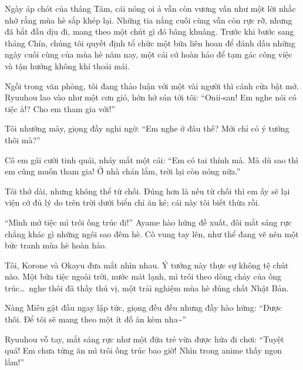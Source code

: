 \documentclass[../main.tex]{subfiles}
\begin{document}


Ngày áp chót của tháng Tám, cái nóng oi ả vẫn còn vương vấn như một lời nhắc nhở rằng mùa hè sắp khép lại. Những tia nắng cuối cùng vẫn còn rực rỡ, nhưng đã bắt đầu dịu đi, mang theo một chút gì đó bâng khuâng. Trước khi bước sang tháng Chín, chúng tôi quyết định tổ chức một bữa liên hoan để đánh dấu những ngày cuối cùng của mùa hè năm nay, một cái cớ hoàn hảo để tạm gác công việc và tận hưởng không khí thoải mái.

Ngồi trong văn phòng, tôi đang thảo luận với một vài người thì cánh cửa bật mở. Ryuuhou lao vào như một cơn gió, hớn hở sán tới tôi: ``Onii-san! Em nghe nói có tiệc à!? Cho em tham gia với!''

Tôi nhướng mày, giọng đầy nghi ngờ: ``Em nghe ở đâu thế? Mới chỉ có ý tưởng thôi mà?''

Cô em gái cười tinh quái, nháy mắt một cái: ``Em có tai thính mà. Mà dù sao thì em cũng muốn tham gia! Ở nhà chán lắm, trời lại còn nóng nữa.''

Tôi thở dài, nhưng không thể từ chối. Đúng hơn là nếu từ chối thì em ấy sẽ lại viện cớ đủ lý do trên trời dưới biển chỉ ăn ké; cái này tôi biết thừa rồi.

``Mình mở tiệc mì trôi ống trúc đi!'' Ayame hào hứng đề xuất, đôi mắt sáng rực chẳng khác gì những ngôi sao đêm hè. Cô vung tay lên, như thể đang vẽ nên một bức tranh mùa hè hoàn hảo.

Tôi, Korone và Okayu đưa mắt nhìn nhau. Ý tưởng này thực sự không tệ chút nào. Một bữa tiệc ngoài trời, nước mát lạnh, mì trôi theo dòng chảy của ống trúc\dots\ nghe thôi đã thấy thú vị, một trải nghiệm mùa hè đúng chất Nhật Bản.

Nàng Miêu gật đầu ngay lập tức, giọng đều đều nhưng đầy hào hứng: ``Được thôi. Để tôi sẽ mang theo một ít đồ ăn kèm nha\~{}''

Ryuuhou vỗ tay, mắt sáng rực như một đứa trẻ vừa được hứa đi chơi: ``Tuyệt quá! Em chưa từng ăn mì trôi ống trúc bao giờ! Nhìn trong anime thấy ngon lắm!''
\end{document}
